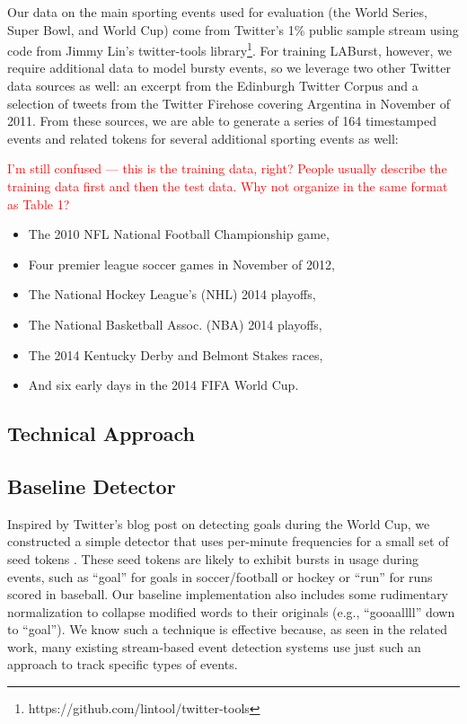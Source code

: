 \documentclass{sig-alternate}
\newcommand{\red}[1]{\textcolor{red}{#1}}
\begin{document}
Our data on the main sporting events used for evaluation (the World Series, Super Bowl, and World Cup) come from Twitter's 1\% public sample stream using code from Jimmy Lin's twitter-tools library\footnote{https://github.com/lintool/twitter-tools}.
For training LABurst, however, we require additional data to model bursty events, so we leverage two other Twitter data sources as well: an excerpt from the Edinburgh Twitter Corpus \cite{Petrovic:2010:ETC:1860667.1860680} and a selection of tweets from the Twitter Firehose covering Argentina in November of 2011.
From these sources, we are able to generate a series of 164 timestamped events and related tokens for several additional sporting events as well: %
%

\red{I'm still confused --- this is the training data, right? People usually describe the training data first and then the test data. Why not organize in the same format as Table 1?}

\begin{itemize} 
\item The 2010 NFL National Football Championship game, 
\item Four premier league soccer games in November of 2012, %
\item The National Hockey League's (NHL) 2014 playoffs, 
\item The National Basketball Assoc. (NBA) 2014 playoffs, 
\item The 2014 Kentucky Derby and Belmont Stakes races, 
\item And six early days in the 2014 FIFA World Cup.
\end{itemize}

\subsection{Technical Approach}

\subsection{Baseline Detector}

Inspired by Twitter's blog post on detecting goals during the World Cup, we constructed a simple detector that uses per-minute frequencies for a small set of seed tokens \cite{Cipriani2014}. 
These seed tokens are likely to exhibit bursts in usage during events, such as ``goal'' for goals in soccer/football or hockey or ``run'' for runs scored in baseball.
Our baseline implementation also includes some rudimentary normalization to collapse modified words to their originals (e.g., ``gooaallll'' down to ``goal'').
We know such a technique is effective because, as seen in the related work, many existing stream-based event detection systems use just such an approach to track specific types of events.
\end{document}
